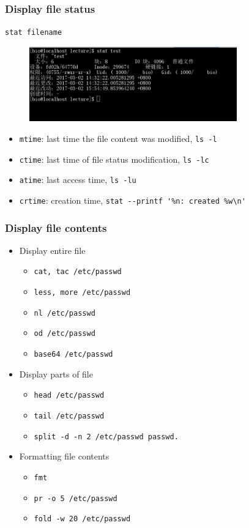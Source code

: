 \documentclass[red]{beamer}
\begin{document}
\begin{CJK*}{UTF8}{gbsn}
\begin{frame}
\frametitle{Display file status}
\lstinline{stat filename}
\begin{figure}[ht]
\includegraphics[width=0.80\textwidth]{images/stat.png}
\end{figure}
\begin{itemize}
	\item \texttt{mtime}: last time the file content was modified, \lstinline{ls -l}
	\item \texttt{ctime}: last time of file status modification, \lstinline{ls -lc}
	\item \texttt{atime}: last access time, \lstinline{ls -lu}
	\item \texttt{crtime}: creation time, \lstinline{stat --printf '%n: created %w\n'}
\end{itemize}
\end{frame}

\begin{frame}[containsverbatim]
\frametitle{Display file contents}
\begin{itemize}
	\item Display entire file
	\begin{itemize}
		\item \lstinline{cat, tac /etc/passwd}
		\item \lstinline{less, more /etc/passwd}
		\item \lstinline{nl /etc/passwd}
		\item \lstinline{od /etc/passwd}
		\item \lstinline{base64 /etc/passwd}
	\end{itemize}
	\item Display parts of file
	\begin{itemize}
		\item \lstinline{head /etc/passwd}
		\item \lstinline{tail /etc/passwd}
		\item \lstinline{split -d -n 2 /etc/passwd passwd.}
	\end{itemize}
	\item Formatting file contents
	\begin{itemize}
		\item \lstinline{fmt }
		\item \lstinline{pr -o 5 /etc/passwd}
		\item \lstinline{fold -w 20 /etc/passwd}
	\end{itemize}
\end{itemize}
\end{frame}



\end{CJK*}
\end{document}
